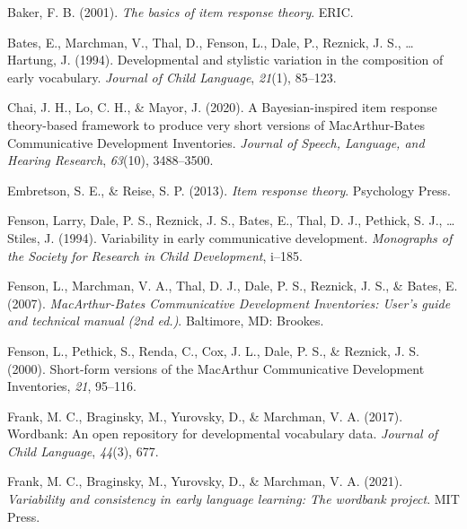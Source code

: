 \documentclass[10pt, letterpaper]{article}
\newenvironment{CSLReferences}%
  {}%
  {\par}
\begin{document}
\setlength{\parindent}{-0.1in} 
\setlength{\leftskip}{0.125in}

\noindent

\hypertarget{refs}{}
\begin{CSLReferences}{1}{0}
\leavevmode{}%
Baker, F. B. (2001). \emph{The basics of item response theory}. ERIC.

\leavevmode{}%
Bates, E., Marchman, V., Thal, D., Fenson, L., Dale, P., Reznick, J. S.,
\ldots{} Hartung, J. (1994). Developmental and stylistic variation in
the composition of early vocabulary. \emph{Journal of Child Language},
\emph{21}(1), 85--123.

\leavevmode{}%
Chai, J. H., Lo, C. H., \& Mayor, J. (2020). A {B}ayesian-inspired item
response theory-based framework to produce very short versions of
{M}ac{A}rthur-{B}ates {C}ommunicative {D}evelopment {I}nventories.
\emph{Journal of Speech, Language, and Hearing Research}, \emph{63}(10),
3488--3500.

\leavevmode{}%
Embretson, S. E., \& Reise, S. P. (2013). \emph{Item response theory}.
Psychology Press.

\leavevmode{}%
Fenson, Larry, Dale, P. S., Reznick, J. S., Bates, E., Thal, D. J.,
Pethick, S. J., \ldots{} Stiles, J. (1994). Variability in early
communicative development. \emph{Monographs of the Society for Research
in Child Development}, i--185.

\leavevmode{}%
Fenson, L., Marchman, V. A., Thal, D. J., Dale, P. S., Reznick, J. S.,
\& Bates, E. (2007). \emph{{M}ac{A}rthur-{B}ates {C}ommunicative
{D}evelopment {I}nventories: User's guide and technical manual (2nd
ed.)}. Baltimore, MD: Brookes.

\leavevmode{}%
Fenson, L., Pethick, S., Renda, C., Cox, J. L., Dale, P. S., \& Reznick,
J. S. (2000). Short-form versions of the {M}ac{A}rthur {C}ommunicative
{D}evelopment {I}nventories, \emph{21}, 95--116.

\leavevmode{}%
Frank, M. C., Braginsky, M., Yurovsky, D., \& Marchman, V. A. (2017).
Wordbank: An open repository for developmental vocabulary data.
\emph{Journal of Child Language}, \emph{44}(3), 677.

\leavevmode{}%
Frank, M. C., Braginsky, M., Yurovsky, D., \& Marchman, V. A. (2021).
\emph{Variability and consistency in early language learning: The
wordbank project}. MIT Press.


\end{CSLReferences}
\end{document}
